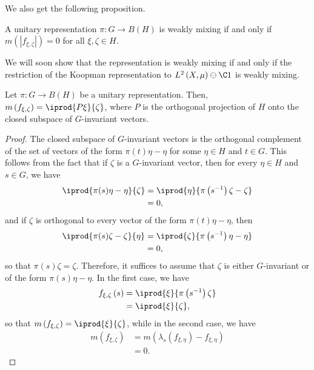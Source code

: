 \documentclass[10pt]{mypackage}
\begin{document}
We also get the following proposition.
\begin{proposition}
  A unitary representation $\pi\colon G\rightarrow B\left( H \right)$ is weakly mixing if and only if $m\left( \left\vert f_{\xi,\zeta} \right\vert \right) = 0$ for all $\xi,\zeta\in H$.
\end{proposition}
We will soon show that the representation is weakly mixing if and only if the restriction of the Koopman representation to $L^2\left( X,\mu \right)\ominus \C 1$ is weakly mixing.
\begin{theorem}
  Let $\pi\colon G\rightarrow B\left( H \right)$ be a unitary representation. Then, $m\left( f_{\xi,\zeta} \right) = \iprod{P\xi}{\zeta}$, where $P$ is the orthogonal projection of $H$ onto the closed subspace of $G$-invariant vectors.
\end{theorem}
\begin{proof}
  The closed subspace of $G$-invariant vectors is the orthogonal complement of the set of vectors of the form $\pi(t)\eta-\eta$ for some $\eta\in H$ and $t\in G$. This follows from the fact that if $\zeta$ is a $G$-invariant vector, then for every $\eta\in H$ and $s\in G$, we have
  \begin{align*}
    \iprod{\pi(s)\eta - \eta}{\zeta} &= \iprod{\eta}{\pi\left( s^{-1} \right)\zeta-\zeta}\\
                                     &= 0,
  \end{align*}
  and if $\zeta$ is orthogonal to every vector of the form $\pi(t)\eta-\eta$, then
  \begin{align*}
    \iprod{\pi(s)\zeta-\zeta}{\eta} &= \iprod{\zeta}{\pi\left( s^{-1} \right)\eta-\eta}\\
                                    &= 0,
  \end{align*}
  so that $\pi(s)\zeta = \zeta$. Therefore, it suffices to assume that $\zeta$ is either $G$-invariant or of the form $\pi(s)\eta-\eta$. In the first case, we have
  \begin{align*}
    f_{\xi,\zeta}\left( s \right) &= \iprod{\xi}{\pi\left( s^{-1} \right)\zeta}\\
                                  &= \iprod{\xi}{\zeta},
  \end{align*}
  so that $m\left( f_{\xi,\zeta} \right) = \iprod{\xi}{\zeta}$, while in the second case, we have
  \begin{align*}
    m\left( f_{\xi,\zeta} \right) &= m\left( \lambda_s\left( f_{\xi,\eta} \right)-f_{\xi,\eta} \right)\\
                                  &= 0.
  \end{align*}
\end{proof}
\end{document}
